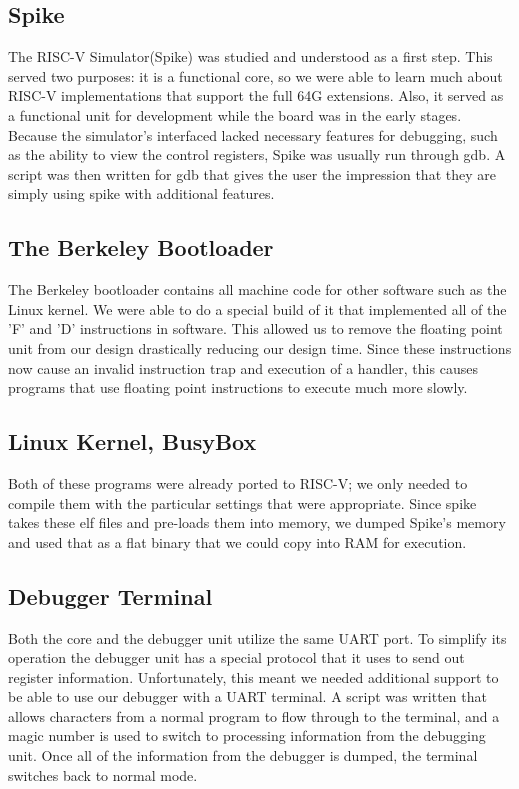 \documentclass{article}
\begin{document}
    \subsection{Spike}
    The RISC-V Simulator(Spike) was studied and understood as a first step. This served two purposes: it is a functional core, so we were able to learn much about RISC-V implementations that support the full 64G extensions.  Also, it served as a functional unit for development while the board was in the early stages. Because the simulator's interfaced lacked necessary features for debugging, such as the ability to view the control registers, Spike was usually run through gdb. A script was then written for gdb that gives the user the impression that they are simply using spike with additional features.
    
    \subsection{The Berkeley Bootloader}
    The Berkeley bootloader contains all machine code for other software such as the Linux kernel. We were able to do a special build of it that implemented all of the 'F' and 'D' instructions in software. This allowed us to remove the floating point unit from our design drastically reducing our design time. Since these instructions now cause an invalid instruction trap and execution of a handler, this causes programs that use floating point instructions to execute much more slowly.
    
    \subsection{Linux Kernel, BusyBox}
    Both of these programs were already ported to RISC-V; we only needed to compile them with the particular settings that were appropriate. Since spike takes these elf files and pre-loads them into memory, we dumped Spike's memory and used that as a flat binary that we could copy into RAM for execution.
    
    \subsection{Debugger Terminal}
    Both the core and the debugger unit utilize the same UART port. To simplify its operation the debugger unit has a special protocol that it uses to send out register information. Unfortunately, this meant we needed additional support to be able to use our debugger with a UART terminal. A script was written that allows characters from a normal program to flow through to the terminal, and a magic number is used to switch to processing information from the debugging unit. Once all of the information from the debugger is dumped, the terminal switches back to normal mode.
    
\end{document}
